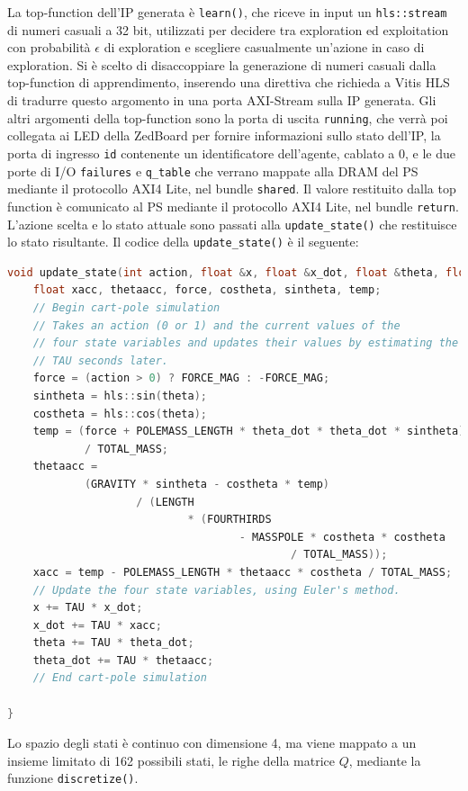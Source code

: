 \documentclass{article}
\begin{document}
La top-function dell'IP generata è \texttt{learn()}, che riceve in input un \texttt{hls::stream} di numeri casuali a 32 bit, utilizzati per decidere tra exploration ed exploitation con probabilità $\epsilon$ di exploration e scegliere casualmente un'azione in caso di exploration. 
Si è scelto di disaccoppiare la generazione di numeri casuali dalla top-function di apprendimento, inserendo una direttiva che richieda a Vitis HLS di tradurre questo argomento in una porta AXI-Stream sulla IP generata. 
Gli altri argomenti della top-function sono la porta di uscita \texttt{running}, che verrà poi collegata ai LED della ZedBoard per fornire informazioni sullo stato dell'IP, la porta di ingresso \texttt{id} contenente un identificatore dell'agente, cablato a 0, e le due porte di I/O \texttt{failures} e \texttt{q\_table} che verrano mappate alla DRAM del PS mediante il protocollo AXI4 Lite, nel bundle \texttt{shared}.
Il valore restituito dalla top function è comunicato al PS mediante il protocollo AXI4 Lite, nel bundle \texttt{return}.
L'azione scelta e lo stato attuale sono passati alla \texttt{update\_state()} che restituisce lo stato risultante. 
Il codice della \texttt{update\_state()} è il seguente:

\begin{lstlisting}[language=C++]
void update_state(int action, float &x, float &x_dot, float &theta, float &theta_dot) {
	float xacc, thetaacc, force, costheta, sintheta, temp;
	// Begin cart-pole simulation
	// Takes an action (0 or 1) and the current values of the
	// four state variables and updates their values by estimating the state
	// TAU seconds later.
	force = (action > 0) ? FORCE_MAG : -FORCE_MAG;
	sintheta = hls::sin(theta);
	costheta = hls::cos(theta);
	temp = (force + POLEMASS_LENGTH * theta_dot * theta_dot * sintheta)
			/ TOTAL_MASS;
	thetaacc =
			(GRAVITY * sintheta - costheta * temp)
					/ (LENGTH
							* (FOURTHIRDS
									- MASSPOLE * costheta * costheta
											/ TOTAL_MASS));
	xacc = temp - POLEMASS_LENGTH * thetaacc * costheta / TOTAL_MASS;
	// Update the four state variables, using Euler's method.
	x += TAU * x_dot;
	x_dot += TAU * xacc;
	theta += TAU * theta_dot;
	theta_dot += TAU * thetaacc;
	// End cart-pole simulation

}
\end{lstlisting}
Lo spazio degli stati è continuo con dimensione 4, ma viene mappato a un insieme limitato di 162 possibili stati, le righe della matrice $Q$, mediante la funzione \texttt{discretize()}. 
\end{document}
